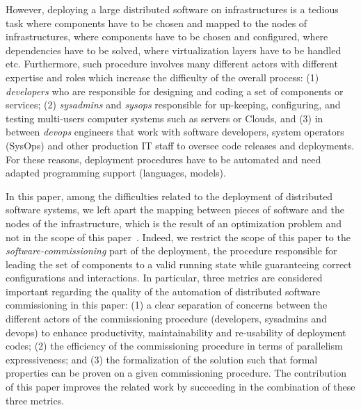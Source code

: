 However, deploying a large distributed software on infrastructures is a tedious task where components have to be chosen and mapped to the nodes of infrastructures, where components have to be chosen and configured, where dependencies have to be solved, where virtualization layers have to be handled etc. Furthermore, such procedure involves many different actors with different expertise and roles which increase the difficulty of the overall process: (1) \emph{developers} who are responsible for designing and coding a set of components or services; (2) \emph{sysadmins} and \emph{sysops} responsible for up-keeping, configuring, and testing multi-users computer systems such as servers or Clouds, and (3) in between \emph{devops} engineers that work with software developers, system operators (SysOps) and other production IT staff to oversee code releases and deployments. For these reasons, deployment procedures have to be automated and need adapted programming support (\ie languages, models).

In this paper, among the difficulties related to the deployment of distributed software systems, we left apart the mapping between pieces of software and the nodes of the infrastructure, which is the result of an optimization problem and not in the scope of this paper~\cite{6409358, 10.1007/978-3-319-47677-3_15, cadorel:hal-02165835, ccgridemile, 10.5555/2432523.2432528}. Indeed, we restrict the scope of this paper to the \emph{software-commissioning} part of the deployment, \ie the procedure responsible for leading the set of components to a valid running state while guaranteeing correct configurations and interactions.
%
In particular, three metrics are considered important regarding the quality of
the automation of distributed software commissioning in this paper: (1) a clear separation of concerns between the different actors of the commissioning procedure (\ie developers, sysadmins and devops) to enhance productivity, maintainability
and re-usability of deployment codes; (2) the efficiency of the commissioning procedure in terms of parallelism expressiveness; and (3) the formalization of the solution such that formal properties can be proven on a given commissioning procedure. The contribution of this paper improves the related work by succeeding in the combination of these three metrics.
%

